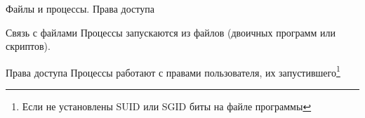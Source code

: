 \begin{frame}{Файлы и процессы. Права доступа}

  \begin{block}{Связь с файлами}
    Процессы запускаются из файлов (двоичных программ или скриптов).
  \end{block}

  \begin{block}{Права доступа}
    Процессы работают с правами пользователя, их запустившего\footnote{Если не установлены SUID или SGID биты на файле программы}
  \end{block}

\end{frame}
